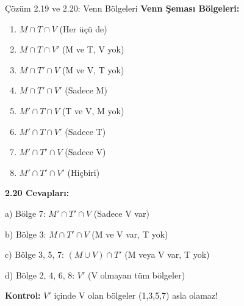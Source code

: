 \documentclass[light]{lutbeamer}
\begin{document}
\begin{frame}{Çözüm 2.19 ve 2.20: Venn Bölgeleri}
    \color{blue}
    \footnotesize
    \textbf{Venn Şeması Bölgeleri:}
    \begin{enumerate}
        \item $M \cap T \cap V$ (Her üçü de)
        \item $M \cap T \cap V'$ (M ve T, V yok)
        \item $M \cap T' \cap V$ (M ve V, T yok)
        \item $M \cap T' \cap V'$ (Sadece M)
        \item $M' \cap T \cap V$ (T ve V, M yok)
        \item $M' \cap T \cap V'$ (Sadece T)
        \item $M' \cap T' \cap V$ (Sadece V)
        \item $M' \cap T' \cap V'$ (Hiçbiri)
    \end{enumerate}
    
    \textbf{2.20 Cevapları:}
    
    a) Bölge 7: $M' \cap T' \cap V$ (Sadece V var)
    
    b) Bölge 3: $M \cap T' \cap V$ (M ve V var, T yok)
    
    c) Bölge 3, 5, 7: $(M \cup V) \cap T'$ (M veya V var, T yok)
    
    d) Bölge 2, 4, 6, 8: $V'$ (V olmayan tüm bölgeler)
    
    \footnotesize
    \textbf{Kontrol:} $V'$ içinde V olan bölgeler (1,3,5,7) asla olamaz!
\end{frame}
\end{document}
